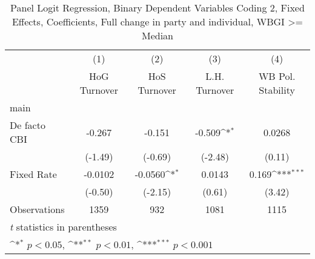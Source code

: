 \begin{table}[htbp]\centering
\def\sym#1{\ifmmode^{#1}\else\(^{#1}\)\fi}
\caption{Panel Logit Regression, Binary Dependent Variables Coding 2, Fixed Effects, Coefficients, Full change in party and individual, WBGI >= Median \label{logitFEMultInd2DF}}
\begin{tabular}{l*{4}{c}}
\toprule
                                        &\multicolumn{1}{c}{(1)}&\multicolumn{1}{c}{(2)}&\multicolumn{1}{c}{(3)}&\multicolumn{1}{c}{(4)}\\
                                        &\multicolumn{1}{c}{HoG Turnover}&\multicolumn{1}{c}{HoS Turnover}&\multicolumn{1}{c}{L.H. Turnover}&\multicolumn{1}{c}{WB Pol. Stability}\\
\midrule
main                                    &                  &                  &                  &                  \\
De facto CBI                            &   -0.267         &   -0.151         &   -0.509\sym{*}  &   0.0268         \\
                                        &  (-1.49)         &  (-0.69)         &  (-2.48)         &   (0.11)         \\
\addlinespace
Fixed Rate                              &  -0.0102         &  -0.0560\sym{*}  &   0.0143         &    0.169\sym{***}\\
                                        &  (-0.50)         &  (-2.15)         &   (0.61)         &   (3.42)         \\
\midrule
Observations                            &     1359         &      932         &     1081         &     1115         \\
\bottomrule
\multicolumn{5}{l}{\footnotesize \textit{t} statistics in parentheses}\\
\multicolumn{5}{l}{\footnotesize \sym{*} \(p<0.05\), \sym{**} \(p<0.01\), \sym{***} \(p<0.001\)}\\
\end{tabular}
\end{table}
